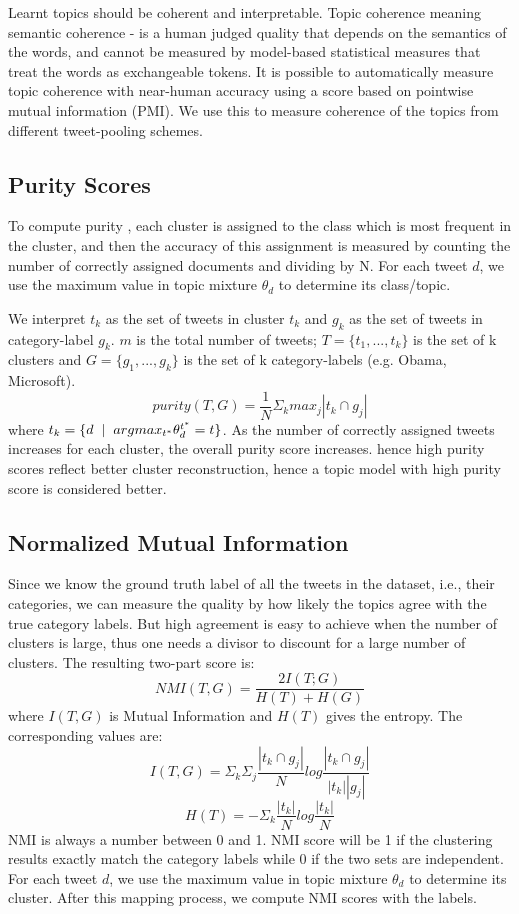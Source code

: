 \documentclass{sig-alternate}
\begin{document}
Learnt topics should be coherent and interpretable.  Topic coherence 
meaning semantic coherence - is a human judged quality that depends on
the semantics of the words, and cannot be measured by model-based
statistical measures that treat the words as exchangeable tokens.  It
is possible to automatically measure topic coherence with near-human
accuracy \cite{baldwin10} using a score based on pointwise mutual
information (PMI).  We use this to measure coherence of the topics
from different tweet-pooling schemes.

\subsection{Purity Scores}

To compute purity \cite{MRS08}, each cluster is assigned to the class
which is most frequent in the cluster, and then the accuracy of this
assignment is measured by counting the number of correctly assigned
documents and dividing by N. For each tweet $d$, we use the maximum
value in topic mixture $\theta_{d} $ to determine its class/topic.

We interpret $t_{k}$ as the set of tweets in cluster $t_{k}$ and
$g_{k}$ as the set of tweets in category-label $g_{k}$. $m$ is the
total number of tweets; $T = \lbrace t_{1}, ... , t_{k} \rbrace$ is
the set of k clusters and $ G = \lbrace g_{1}, ... , g_{k}\rbrace $ is
the set of k category-labels (e.g. Obama, Microsoft).\vspace{-3pt}
\[
 purity (T,G) = \frac{1}{N} \Sigma_{k} max_{j} |t_{k} \cap g_{j}|
\]
where $ t_k = \lbrace  d \hspace{2 mm} |  \hspace{2 mm} argmax_{t^*} \theta^{t^{*}}_d = t \rbrace $.
As the number of correctly assigned tweets increases for each cluster,
the overall purity score increases. hence high purity scores reflect
better cluster reconstruction, hence a topic model with high purity
score is considered better.

\subsection{Normalized Mutual Information}

Since we know the ground truth label of all the tweets in the dataset,
i.e., their categories, we can measure the quality by how likely the
topics agree with the true category labels.
But high agreement is easy to achieve when the number of clusters is
large, thus one needs a divisor to discount for a large number of clusters.
The resulting two-part score is:
\[
NMI(T,G) = \frac{2 I(T;G)}{H(T) + H(G)} 
\]
where $I(T,G)$ is Mutual Information and $H(T)$ gives the entropy. The 
corresponding values are:
\[
I(T,G) = \Sigma_{k} \Sigma_{j} \frac{|t_{k} \cap g_{j}|}{N} log \frac{|t_{k} \cap g_{j}|}{|t_{k}| |g_{j}|} 
\]
\[
H(T) = - \Sigma_k \frac{|t_k|}{N} log \frac{|t_k|}{N} 
\]
NMI \cite{MRS08} is always a number between 0 and 1. NMI score will be
1 if the clustering results exactly match the category labels while 0
if the two sets are independent. For each tweet $d$, we use the
maximum value in topic mixture $ \theta_{d} $ to determine its
cluster. After this mapping process, we compute NMI scores with the
labels.
\end{document}
